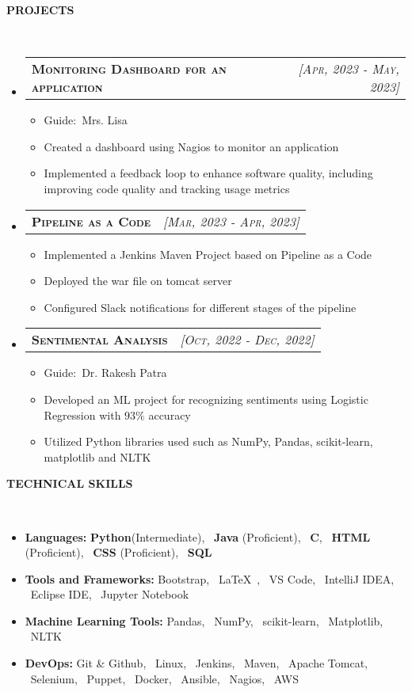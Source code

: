 \documentclass[a4paper,10pt]{article}
\makeatletter
\newcommand{\lsep}{-0.5cm}
\newcommand{\resitem}[1]{\item #1 \vspace{-2pt}}
\newcommand{\resheading}[1]{{\small \colorbox{mygrey}{\begin{minipage}{0.975\textwidth}{\textbf{#1 \vphantom{p\^{E}}}}\end{minipage}}}}
\newcommand{\ressubheading}[3]{
\begin{tabular*}{6.62in}{l @{\extracolsep{\fill}} r}
	\textsc{{\textbf{#1}}} & \textsc{\textit{[#2]}} \\
\end{tabular*}\vspace{-8pt}}
\makeatother
\begin{document}
\resheading{\textbf{PROJECTS} }\\[\lsep]
\begin{itemize}
\setlength\itemsep{0.5em}
\item \ressubheading{Monitoring Dashboard for an application} {Apr, 2023 - May, 2023}{}
\begin{itemize}
    \resitem{Guide:\ Mrs. Lisa}
    \resitem{Created a dashboard using Nagios to monitor an application}
    \resitem{Implemented a feedback loop to enhance software quality, including improving code quality and tracking usage metrics}
\end{itemize}

\item \ressubheading{Pipeline as a Code}{Mar, 2023 - Apr, 2023}{}
\begin{itemize}
    \resitem{Implemented a Jenkins Maven Project based on Pipeline as a Code}
    \resitem{Deployed the war file on tomcat server}
    \resitem{Configured Slack notifications for different stages of the pipeline}
\end{itemize}

\item \ressubheading{Sentimental Analysis}{Oct, 2022 - Dec, 2022}{}
\begin{itemize}
    \resitem{Guide:\ Dr. Rakesh Patra}
    \resitem{Developed an ML project for recognizing sentiments using Logistic Regression with $93\%$ accuracy}
    \resitem{Utilized Python libraries used such as NumPy, Pandas, scikit-learn, matplotlib and NLTK}
\end{itemize} 
\end{itemize}

\resheading{\textbf{TECHNICAL SKILLS} }\\[\lsep]
\begin{itemize}
\setlength\itemsep{0em}
\item \noindent \textbf{Languages:} \textbf{Python}(Intermediate), \ \textbf{Java} (Proficient), \ \textbf{C}, \ \textbf{HTML} (Proficient), \ \textbf{CSS} (Proficient), \ \textbf{SQL}
 \item \noindent\textbf{Tools and Frameworks:} Bootstrap, \  \LaTeX\ , \ VS Code, \ IntelliJ IDEA, \ Eclipse IDE, \ Jupyter Notebook
\item \noindent \textbf{Machine Learning Tools:} Pandas, \ NumPy, \ scikit-learn, \ Matplotlib, \ NLTK
\item \noindent \textbf{DevOps:} Git \& Github, \ Linux, \ Jenkins, \ Maven, \ Apache Tomcat, \ Selenium, \ Puppet, \ Docker, \ Ansible, \ Nagios, \ AWS
\end{itemize}
\end{document}
